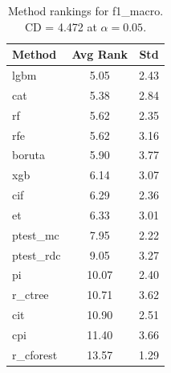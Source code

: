 \begin{table}[h]
\centering
\caption{Method rankings for f1_macro. CD = 4.472 at $\alpha=0.05$.}
\label{tab:ranks_f1_macro}
\begin{tabular}{lcc}
\toprule
Method & Avg Rank & Std \\
\midrule
lgbm & 5.05 & 2.43 \\
cat & 5.38 & 2.84 \\
rf & 5.62 & 2.35 \\
rfe & 5.62 & 3.16 \\
boruta & 5.90 & 3.77 \\
xgb & 6.14 & 3.07 \\
cif & 6.29 & 2.36 \\
et & 6.33 & 3.01 \\
ptest_mc & 7.95 & 2.22 \\
ptest_rdc & 9.05 & 3.27 \\
pi & 10.07 & 2.40 \\
r_ctree & 10.71 & 3.62 \\
cit & 10.90 & 2.51 \\
cpi & 11.40 & 3.66 \\
r_cforest & 13.57 & 1.29 \\
\bottomrule
\end{tabular}
\end{table}